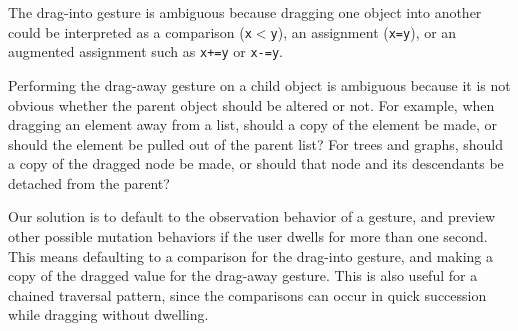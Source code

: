 The drag-into gesture is ambiguous because dragging one object into
another could be interpreted as a comparison (\texttt{x$<$y}), an
assignment (\texttt{x=y}), or an augmented assignment such as
\texttt{x+=y} or \texttt{x-=y}.

Performing the drag-away gesture on a child object is ambiguous because it is
not obvious whether the parent object should be altered or not. For example,
when dragging an element away from a list, should a copy of the element be made,
or should the element be pulled out of the parent list? For trees and graphs,
should a copy of the dragged node be made, or should that node and its
descendants be detached from the parent?

Our solution is to default to the observation behavior of a gesture, and preview
other possible mutation behaviors if the user dwells for more than one second.
This means defaulting to a comparison for the drag-into gesture, and making a
copy of the dragged value for the drag-away gesture.
%
This is also useful for a chained traversal pattern, since the comparisons
can occur in quick succession while dragging without dwelling.

